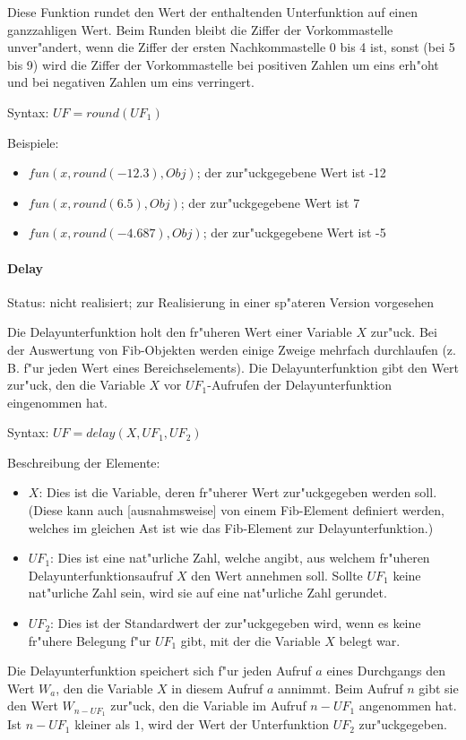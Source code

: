 Diese Funktion rundet den Wert der enthaltenden Unterfunktion auf einen ganzzahligen Wert.
Beim Runden bleibt die Ziffer der Vorkommastelle unver"andert, wenn die Ziffer der ersten Nachkommastelle 0 bis 4 ist, sonst (bei 5 bis 9) wird die Ziffer der Vorkommastelle bei positiven Zahlen um eins erh"oht und bei negativen Zahlen um eins verringert.

\bigskip\noindent
Syntax:
$UF=round( UF_1 )$

\bigskip\noindent
Beispiele:
\begin{itemize}
 \item $fun(x, round(-12.3), Obj)$; der zur"uckgegebene Wert ist -12
 \item $fun(x, round(6.5), Obj)$; der zur"uckgegebene Wert ist 7
 \item $fun(x, round(-4.687), Obj)$; der zur"uckgegebene Wert ist -5
\end{itemize}




\paragraph{Delay}

Status: nicht realisiert; zur Realisierung in einer sp"ateren Version vorgesehen

\bigskip\noindent
Die Delayunterfunktion holt den fr"uheren Wert einer Variable $X$ zur"uck. Bei der Auswertung von Fib-Objekten werden einige Zweige mehrfach durchlaufen (z. B. f"ur jeden Wert eines Bereichselements). Die Delayunterfunktion gibt den Wert zur"uck, den die Variable $X$ vor $UF_1$-Aufrufen der Delayunterfunktion eingenommen hat.

\bigskip\noindent
Syntax:
$UF=delay( X, UF_1, UF_2 )$

\bigskip\noindent
Beschreibung der Elemente:
\begin{itemize}
 \item $X$: Dies ist die Variable, deren fr"uherer Wert zur"uckgegeben werden soll. (Diese kann auch [ausnahmsweise] von einem Fib-Element definiert werden, welches im gleichen Ast ist wie das Fib-Element zur Delayunterfunktion.) %
 \item $UF_1$: Dies ist eine nat"urliche Zahl, welche angibt, aus welchem fr"uheren Delayunterfunktionsaufruf $X$ den Wert annehmen soll. Sollte $UF_1$ keine nat"urliche Zahl sein, wird sie auf eine nat"urliche Zahl gerundet.
 \item $UF_2$: Dies ist der Standardwert der zur"uckgegeben wird, wenn es keine fr"uhere Belegung f"ur $UF_1$ gibt, mit der die Variable $X$ belegt war.
\end{itemize}
Die Delayunterfunktion speichert sich f"ur jeden Aufruf $a$ eines Durchgangs den Wert $W_a$, den die Variable $X$ in diesem Aufruf $a$ annimmt. Beim Aufruf $n$ gibt sie den Wert $W_{n-UF_1}$ zur"uck, den die Variable im Aufruf $n-UF_1$ angenommen hat. Ist $n-UF_1$ kleiner als $1$, wird der Wert der Unterfunktion $UF_2$ zur"uckgegeben.

